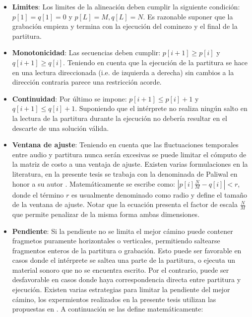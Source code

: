 \documentclass
  [ams,pdfout]%
	{aeslac}
\begin{document}
\begin{itemize}
\item \textbf{Limites}: Los limites de la alineación deben cumplir la siguiente condición: $p[1] = q [1] = 0$ y $p[L] = M, q[L] = N$. Es razonable suponer que la grabación empieza y termina con la ejecución del cominezo y el final de la partitura.
\item \textbf{Monotonicidad}: Las secuencias deben cumplir: $p[i+1] \geq p[i]$ y $q[i+1] \geq q[i]$. Teniendo en cuenta que la ejecución de la partitura se hace en una lectura direccionada (i.e. de izquierda a derecha) sin cambios a la dirección contraria parece una restricción acorde. 
\item \textbf{Continuidad}: Por último se impone: $p[i+1] \leq p[i] + 1$ y $q[i+1] \leq q[i] + 1$.  Suponiendo que el intérprete no realiza ningún salto en la lectura de la partitura durante la ejecución no debería resultar en el descarte de una solución válida. 
\item \textbf{Ventana de ajuste}: Teniendo en cuenta que las fluctuaciones temporales entre audio y partitura nunca serán excesivas se puede limitar el cómputo de la matriz de costo a una ventaja de ajuste. Existen varias formulaciones en la literatura, en la presente tesis se trabaja con la denominada de Paliwal en honor a su autor \cite{paliwal1982modification}. Matemáticamente se escribe como: $|p[i]\frac{N}{M}-q[i]|<r$, donde el término $r$ es usualmente denominado como radio y define el tamaño de la ventana de ajuste. Notar que la ecuación presenta el factor de escala $\frac{N}{M}$ que permite penalizar de la misma forma ambas dimensiones. 
\item \textbf{Pendiente}: Si la pendiente no se limita el mejor cámino puede contener fragmetos puramente horizontales o verticales, permitiendo saltearse fragmentos enteros de la partitura o grabación. Esto puede ser favorable en casos donde el intérprete se saltea una parte de la partitura, o ejecuta un material sonoro que no se encuentra escrito. Por el contrario, puede ser desfavorable en casos donde haya correspondencia directa entre partitura y ejecución. Existen varias estrategias para limitar la pendiente del mejor cámino, los expermientos realizados en la presente tesis utilizan las propuestas en \cite{sakoe1978dynamic}. A continuación se las define matemáticamente: 




\end{itemize}
\end{document}
